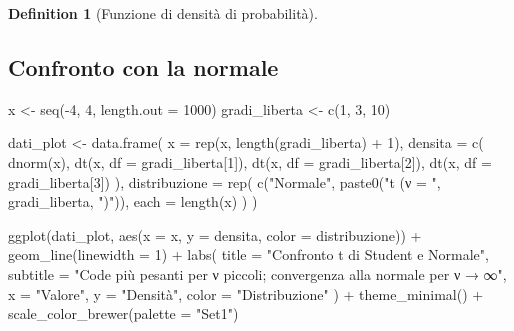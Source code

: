 \documentclass[
  letterpaper,
  DIV=11,
  numbers=noendperiod,
  oneside]{scrreprt}
\newenvironment{Shaded}{\begin{snugshade}}{\end{snugshade}}
\newcommand{\AttributeTok}[1]{\textcolor[rgb]{0.40,0.45,0.13}{#1}}
\newcommand{\DecValTok}[1]{\textcolor[rgb]{0.68,0.00,0.00}{#1}}
\newcommand{\FunctionTok}[1]{\textcolor[rgb]{0.28,0.35,0.67}{#1}}
\newcommand{\NormalTok}[1]{\textcolor[rgb]{0.00,0.23,0.31}{#1}}
\newcommand{\OtherTok}[1]{\textcolor[rgb]{0.00,0.23,0.31}{#1}}
\newcommand{\SpecialCharTok}[1]{\textcolor[rgb]{0.37,0.37,0.37}{#1}}
\newcommand{\StringTok}[1]{\textcolor[rgb]{0.13,0.47,0.30}{#1}}
\theoremstyle{definition}
\theoremstyle{plain}
\theoremstyle{definition}
\newtheorem{definition}{Definition}[chapter]
\theoremstyle{remark}
\begin{document}
\begin{definition}[Funzione di densità di
probabilità]
\subsection{Confronto con la normale}\label{confronto-con-la-normale}

\begin{Shaded}
\begin{Highlighting}[]
\NormalTok{x }\OtherTok{\textless{}{-}} \FunctionTok{seq}\NormalTok{(}\SpecialCharTok{{-}}\DecValTok{4}\NormalTok{, }\DecValTok{4}\NormalTok{, }\AttributeTok{length.out =} \DecValTok{1000}\NormalTok{)}
\NormalTok{gradi\_liberta }\OtherTok{\textless{}{-}} \FunctionTok{c}\NormalTok{(}\DecValTok{1}\NormalTok{, }\DecValTok{3}\NormalTok{, }\DecValTok{10}\NormalTok{)}

\NormalTok{dati\_plot }\OtherTok{\textless{}{-}} \FunctionTok{data.frame}\NormalTok{(}
  \AttributeTok{x =} \FunctionTok{rep}\NormalTok{(x, }\FunctionTok{length}\NormalTok{(gradi\_liberta) }\SpecialCharTok{+} \DecValTok{1}\NormalTok{),}
  \AttributeTok{densita =} \FunctionTok{c}\NormalTok{(}
    \FunctionTok{dnorm}\NormalTok{(x),}
    \FunctionTok{dt}\NormalTok{(x, }\AttributeTok{df =}\NormalTok{ gradi\_liberta[}\DecValTok{1}\NormalTok{]),}
    \FunctionTok{dt}\NormalTok{(x, }\AttributeTok{df =}\NormalTok{ gradi\_liberta[}\DecValTok{2}\NormalTok{]),}
    \FunctionTok{dt}\NormalTok{(x, }\AttributeTok{df =}\NormalTok{ gradi\_liberta[}\DecValTok{3}\NormalTok{])}
\NormalTok{  ),}
  \AttributeTok{distribuzione =} \FunctionTok{rep}\NormalTok{(}
    \FunctionTok{c}\NormalTok{(}\StringTok{"Normale"}\NormalTok{, }\FunctionTok{paste0}\NormalTok{(}\StringTok{"t (ν = "}\NormalTok{, gradi\_liberta, }\StringTok{")"}\NormalTok{)), }
    \AttributeTok{each =} \FunctionTok{length}\NormalTok{(x)}
\NormalTok{  )}
\NormalTok{)}

\FunctionTok{ggplot}\NormalTok{(dati\_plot, }\FunctionTok{aes}\NormalTok{(}\AttributeTok{x =}\NormalTok{ x, }\AttributeTok{y =}\NormalTok{ densita, }\AttributeTok{color =}\NormalTok{ distribuzione)) }\SpecialCharTok{+}
  \FunctionTok{geom\_line}\NormalTok{(}\AttributeTok{linewidth =} \DecValTok{1}\NormalTok{) }\SpecialCharTok{+}
  \FunctionTok{labs}\NormalTok{(}
    \AttributeTok{title =} \StringTok{"Confronto t di Student e Normale"}\NormalTok{,}
    \AttributeTok{subtitle =} \StringTok{"Code più pesanti per ν piccoli; convergenza alla normale per ν → ∞"}\NormalTok{,}
    \AttributeTok{x =} \StringTok{"Valore"}\NormalTok{, }\AttributeTok{y =} \StringTok{"Densità"}\NormalTok{, }\AttributeTok{color =} \StringTok{"Distribuzione"}
\NormalTok{  ) }\SpecialCharTok{+}
  \FunctionTok{theme\_minimal}\NormalTok{() }\SpecialCharTok{+}
  \FunctionTok{scale\_color\_brewer}\NormalTok{(}\AttributeTok{palette =} \StringTok{"Set1"}\NormalTok{)}
\end{Highlighting}
\end{Shaded}


\end{definition}
\end{document}
